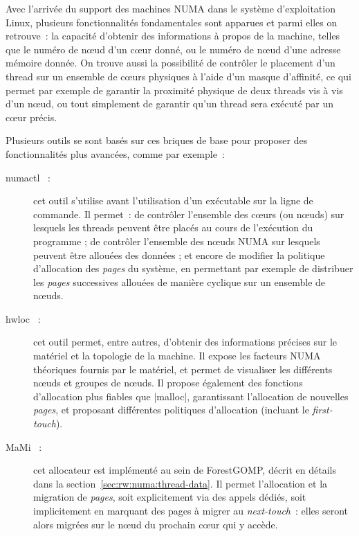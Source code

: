 Avec l'arrivée du support des machines NUMA dans le système d'exploitation Linux, plusieurs fonctionnalités fondamentales sont apparues et parmi elles on retrouve~: la capacité d'obtenir des informations à propos de la machine, telles que le numéro de nœud d'un cœur donné, ou le numéro de nœud d'une adresse mémoire donnée.
On trouve aussi la possibilité de contrôler le placement d'un thread sur un ensemble de cœurs physiques à l'aide d'un masque d'affinité, ce qui permet par exemple de garantir la proximité physique de deux threads vis à vis d'un nœud, ou tout simplement de garantir qu'un thread sera exécuté par un cœur précis.

Plusieurs outils se sont basés sur ces briques de base pour proposer des fonctionnalités plus avancées, comme par exemple~:

\begin{description}
  \item [numactl~\cite{numactl} :] cet outil s'utilise avant l'utilisation d'un exécutable sur la ligne de commande. Il permet~: de contrôler l'ensemble des cœurs (ou nœuds) sur lesquels les threads peuvent être placés au cours de l'exécution du programme ;
    de contrôler l'ensemble des nœuds NUMA sur lesquels peuvent être allouées des données ;
    et encore de modifier la politique d'allocation des \emph{pages} du système, en permettant par exemple de distribuer les \emph{pages} successives allouées de manière cyclique sur un ensemble de nœuds.
  \item [hwloc~\cite{Broquedis2010} :] cet outil permet, entre autres, d'obtenir des informations précises sur le matériel et la topologie de la machine. Il expose les facteurs NUMA théoriques fournis par le matériel, et permet de visualiser les différents nœuds et groupes de nœuds.
  Il propose également des fonctions d'allocation plus fiables que |malloc|, garantissant l'allocation de nouvelles \emph{pages}, et proposant différentes politiques d'allocation (incluant le \emph{first-touch}).
\item [MaMi~\cite{Broquedis2009} :] cet allocateur est implémenté au sein de ForestGOMP, décrit en détails dans la section~\ref{sec:rw:numa:thread-data}. Il permet l'allocation et la migration de \emph{pages}, soit explicitement via des appels dédiés, soit implicitement en marquant des pages à migrer au \emph{next-touch}~: elles seront alors migrées sur le nœud du prochain cœur qui y accède.
\end{description}


\bigskip


